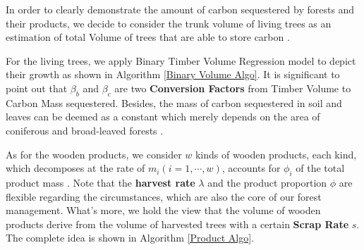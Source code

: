 \documentclass{mcmthesis}
\numberwithin{figure}{section}
\numberwithin{table}{section}
\numberwithin{equation}{section}
\begin{document}
In order to clearly demonstrate the amount of carbon sequestered by forests and their
products, we decide to consider the trunk volume of living trees as an estimation of 
total Volume of trees that are able to store carbon \citep{WangYan}. 
\par
For the living trees, we apply Binary Timber Volume Regression model \citep{LuoQingbang} 
to depict their growth as shown in Algorithm \ref{Binary Volume Algo}. 
It is significant
to point out that $ \beta_b $ and $ \beta_c $ are two \textbf{Conversion Factors} from
Timber Volume to Carbon Mass sequestered. Besides, the mass of carbon sequestered in
soil and leaves can be deemed as a constant which merely depends on the area
of coniferous and broad-leaved forests \citep{YanDeren2011}.
\par
As for the wooden products, we consider $ w $ kinds of wooden products, each kind,
which decomposes at the rate of $ m_i (i = 1,\cdots, w) $, accounts for $ \phi_i$ 
of the total product mass \citep{2006Forest}. Note that the \textbf{harvest rate} $ \lambda $ and the product
proportion $ \phi $ are flexible regarding the circumstances, which are also 
the core of our forest management. What's more, we hold the view that 
the volume of wooden products derive from the volume of harvested trees with a certain
\textbf{Scrap Rate} $ s $. The complete idea is shown in Algorithm \ref{Product Algo}.
\end{document}
